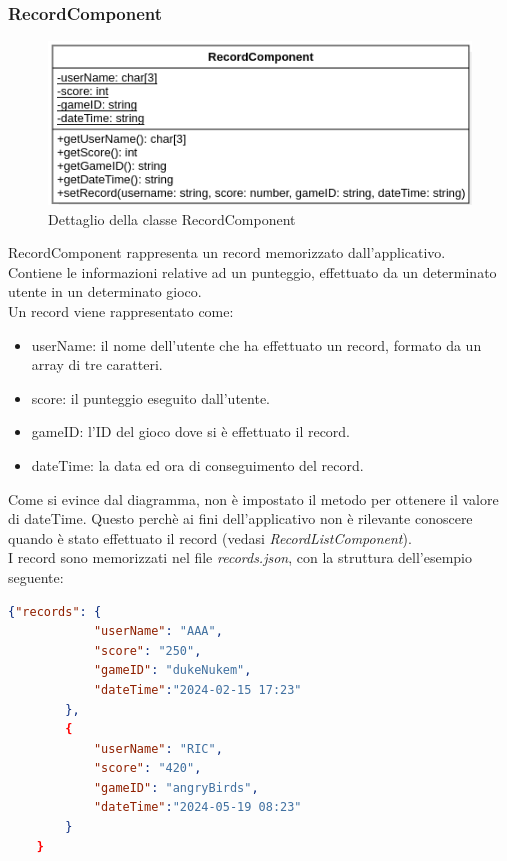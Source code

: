 \subsubsection{RecordComponent}
\begin{figure}[h]
    \centering
    \includegraphics[width=340pt]{images/prog/Record.png}
    \caption{Dettaglio della classe RecordComponent}
    \label{fig:recordComponent}
\end{figure}
RecordComponent rappresenta un record memorizzato dall'applicativo.\\ Contiene le informazioni relative ad un punteggio, effettuato da un determinato utente in un determinato gioco.\\
Un record viene rappresentato come:
\begin{itemize}
    \item userName: il nome dell'utente che ha effettuato un record, formato da un array di tre caratteri.
    \item score: il punteggio eseguito dall'utente.
    \item gameID: l'ID del gioco dove si è effettuato il record.
    \item dateTime: la data ed ora di conseguimento del record.
\end{itemize}
Come si evince dal diagramma, non è impostato il metodo per ottenere il valore di dateTime. Questo perchè ai fini dell'applicativo non è rilevante conoscere quando è stato effettuato il record (vedasi \emph{RecordListComponent}).\\
I record sono memorizzati nel file \emph{records.json}, con la struttura dell'esempio seguente:
\begin{lstlisting}[language=json,firstnumber=1]
    {"records": {
            "userName": "AAA",
            "score": "250",
            "gameID": "dukeNukem",
            "dateTime":"2024-02-15 17:23"
        },
        {
            "userName": "RIC",
            "score": "420",
            "gameID": "angryBirds",
            "dateTime":"2024-05-19 08:23"
        }
    }
\end{lstlisting}
